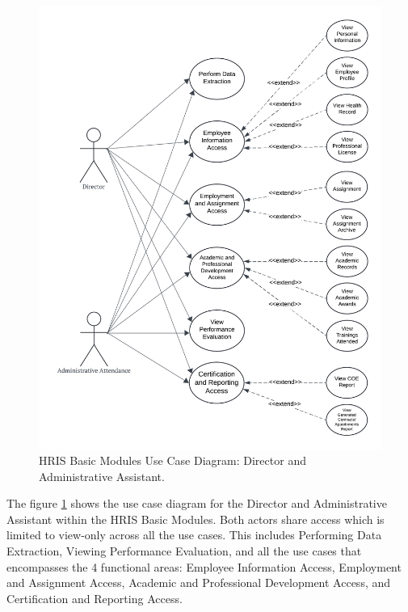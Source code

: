     \begin{figure}[H] 
        \centering
        \includegraphics[width=0.9\linewidth]{figures/images/use-case-basic-3.png}
        \caption{HRIS Basic Modules Use Case Diagram: Director and Administrative Assistant.}
        \label{fig:use-case-basic-3}
    \end{figure}

    The figure \ref{fig:use-case-basic-3} shows the use case diagram for the Director and Administrative Assistant within the HRIS Basic Modules. Both actors share access which is limited to view-only across all the use cases. This includes Performing Data Extraction, Viewing Performance Evaluation, and all the use cases that encompasses the 4 functional areas: Employee Information Access, Employment and Assignment Access, Academic and Professional Development Access, and Certification and Reporting Access. 

